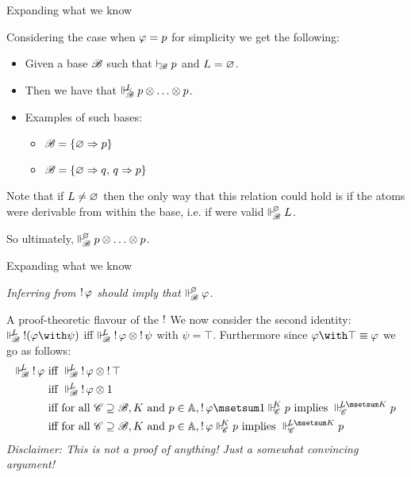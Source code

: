 \documentclass{beamer}
\begin{document}
\begin{frame}{Expanding what we know}
\begin{center}
Considering the case when $\varphi = {p}$ for simplicity we get the following:
\begin{itemize}
\pause
\item Given a base $\mathscr{B}$ such that $\vdash_{\!\!\mathscr{B}}{p}$ and $L=\varnothing$.
\pause
\item Then we have that $\Vdash_{ \!\!\mathscr{B} }^{ \!\!L }{p} \otimes \ldots \otimes {p}$.
\pause
\item Examples of such bases:
\begin{itemize}
	\item $\mathscr{B} = \{\varnothing \Rightarrow {p}\}$
	\item $\mathscr{B} = \{\varnothing \Rightarrow {q},\, {q}\Rightarrow {p} \}$
\end{itemize}
\pause
\end{itemize} 
\vspace{10pt}
Note that if $L \neq \varnothing$ then the only way that this relation could hold is if the atoms were derivable from within the base, i.e. if were valid $\Vdash_{ \!\!\mathscr{B} }^{ \!\!\varnothing }L$.

So ultimately, $\Vdash_{ \!\!\mathscr{B} }^{ \!\!\varnothing }p\otimes \ldots \otimes p$. 
\end{center}
\end{frame}
\begin{frame}{Expanding what we know}
\begin{center}
\noindent
\emph{Inferring from $\mathop{!} \varphi$ should imply that $\Vdash_{ \!\!\mathscr{B} }^{ \!\!\varnothing }\varphi$.}
\end{center}
\end{frame}
\begin{frame}{A proof-theoretic flavour of the $\mathop{!}$}
	We now consider the second identity: $\suppM{\baseB}{L}\bang(\varphi\aand\psi)$ iff $\Vdash_{ \!\!\mathscr{B} }^{ \!\!L }\mathop{!}\varphi \otimes \mathop{!}\psi$
	with $\psi = \top$. Furthermore since $\varphi\aand\top \equiv \varphi$ we go as follows:
	\begin{align}
		\suppM{\baseB}{L}\bang\varphi &\text{ iff } \suppM{\baseB}{L}\bang\varphi \mand \bang\top \\
		&\text{ iff } \suppM{\baseB}{L}\bang\varphi \mand \mtop\\
		&\text{ iff for all } \baseC\baseGeq\baseB, K \text{ and } p\in\At,\bang\varphi\msetsum\mtop\suppM{\baseC}{K}p\text{ implies }\suppM{\baseC}{L\msetsum K}p\\
		&\text{ iff for all } \baseC\baseGeq\baseB, K \text{ and } p\in\At,\bang\varphi\suppM{\baseC}{K}p\text{ implies }\suppM{\baseC}{L\msetsum K}p
	\end{align}
	\pause
	\emph{Disclaimer: This is not a proof of anything! Just a somewhat convincing argument!}
\end{frame}
\end{document}

